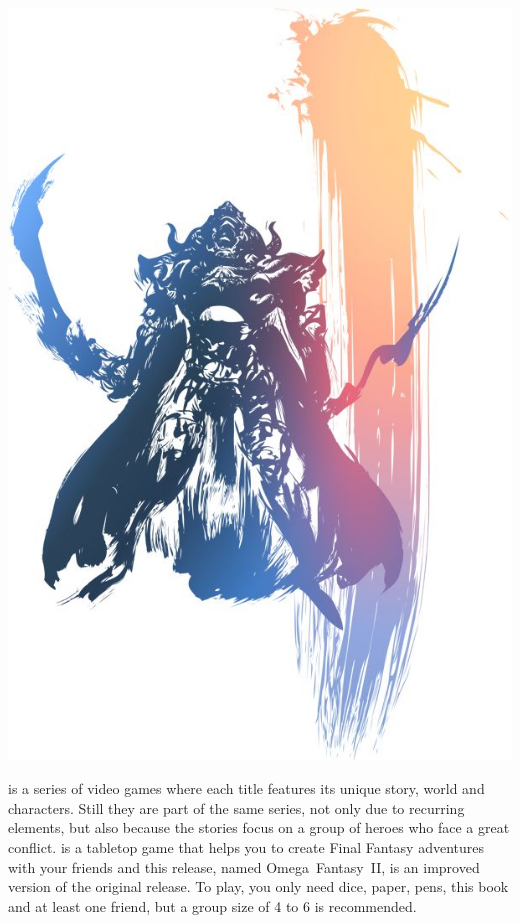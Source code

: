 %
%
\begin{center} \includegraphics[width=\columnwidth]{./art/images/ff12.jpg} \end{center}
%
 is a series of video games where each title features its unique story, world and characters.
Still they are part of the same series, not only due to recurring elements, but also because the stories focus on a group of heroes who face a great conflict.
 is a tabletop game that helps you to create Final Fantasy adventures with your friends and this release, named Omega~Fantasy~II, is an improved version of the original release.
To play, you only need dice, paper, pens, this book and at least one friend, but a group size of 4 to 6 is recommended.

